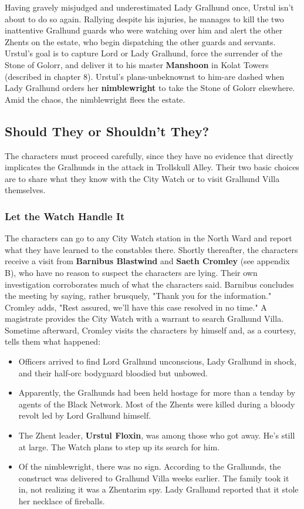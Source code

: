 \documentclass[10pt,a4paper,twoside,twocolumn,openany,nodeprecatedcode]{dndbook}
\begin{document}
Having gravely misjudged and underestimated Lady Gralhund once, Urstul isn't about to do so again. Rallying despite his injuries, he manages to kill the two inattentive Gralhund guards who were watching over him and alert the other Zhents on the estate, who begin dispatching the other guards and servants. Urstul's goal is to capture Lord or Lady Gralhund, force the surrender of the Stone of Golorr, and deliver it to his master \textbf{Manshoon} in Kolat Towers (described in chapter 8).
Urstul's plans-unbeknownst to him-are dashed when Lady Gralhund orders her \textbf{nimblewright} to take the Stone of Golorr elsewhere. Amid the chaos, the nimblewright flees the estate.
\subsection{Should They or Shouldn't They?}
The characters must proceed carefully, since they have no evidence that directly implicates the Gralhunds in the attack in Trollskull Alley. Their two basic choices are to share what they know with the City Watch or to visit Gralhund Villa themselves.
\subsubsection{Let the Watch Handle It}
The characters can go to any City Watch station in the North Ward and report what they have learned to the constables there. Shortly thereafter, the characters receive a visit from \textbf{Barnibus Blastwind} and \textbf{Saeth Cromley} (see appendix B), who have no reason to suspect the characters are lying. Their own investigation corroborates much of what the characters said. Barnibus concludes the meeting by saying, rather brusquely, "Thank you for the information." Cromley adds, "Rest assured, we'll have this case resolved in no time."
A magistrate provides the City Watch with a warrant to search Gralhund Villa. Sometime afterward, Cromley visits the characters by himself and, as a courtesy, tells them what happened:
\begin{itemize}

\item Officers arrived to find Lord Gralhund unconscious, Lady Gralhund in shock, and their half-orc bodyguard bloodied but unbowed.
\item Apparently, the Gralhunds had been held hostage for more than a tenday by agents of the Black Network. Most of the Zhents were killed during a bloody revolt led by Lord Gralhund himself.
\item The Zhent leader, \textbf{Urstul Floxin}, was among those who got away. He's still at large. The Watch plans to step up its search for him.
\item Of the nimblewright, there was no sign. According to the Gralhunds, the construct was delivered to Gralhund Villa weeks earlier. The family took it in, not realizing it was a Zhentarim spy. Lady Gralhund reported that it stole her necklace of fireballs.
\end{itemize}
\end{document}
